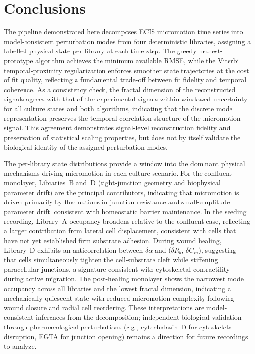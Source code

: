 \documentclass[english, 10pt, a4paper]{article}
\begin{document}
\section{Conclusions }

The pipeline demonstrated here decomposes ECIS micromotion time series into model-consistent perturbation modes from four deterministic libraries, assigning a labelled physical state per library at each time step. The greedy nearest-prototype algorithm achieves the minimum available RMSE, while the Viterbi temporal-proximity regularization enforces smoother state trajectories at the cost of fit quality, reflecting a fundamental trade-off between fit fidelity and temporal coherence. As a consistency check, the fractal dimension of the reconstructed signals agrees with that of the experimental signals within windowed uncertainty for all culture states and both algorithms, indicating that the discrete mode representation preserves the temporal correlation structure of the micromotion signal. This agreement demonstrates signal-level reconstruction fidelity and preservation of statistical scaling properties, but does not by itself validate the biological identity of the assigned perturbation modes.

The per-library state distributions provide a window into the dominant physical mechanisms driving micromotion in each culture scenario. For the confluent monolayer, Libraries~B and~D (tight-junction geometry and biophysical parameter drift) are the principal contributors, indicating that micromotion is driven primarily by fluctuations in junction resistance and small-amplitude parameter drift, consistent with homeostatic barrier maintenance. In the seeding recording, Library~A occupancy broadens relative to the confluent case, reflecting a larger contribution from lateral cell displacement, consistent with cells that have not yet established firm substrate adhesion. During wound healing, Library~D exhibits an anticorrelation between $\delta\alpha$ and ($\delta R_b$, $\delta C_m$), suggesting that cells simultaneously tighten the cell-substrate cleft while stiffening paracellular junctions, a signature consistent with cytoskeletal contractility during active migration. The post-healing monolayer shows the narrowest mode occupancy across all libraries and the lowest fractal dimension, indicating a mechanically quiescent state with reduced micromotion complexity following wound closure and radial cell reordering. These interpretations are model-consistent inferences from the decomposition; independent biological validation through pharmacological perturbations (e.g., cytochalasin~D for cytoskeletal disruption, EGTA for junction opening) remains a direction for future recordings to analyze.
\end{document}
